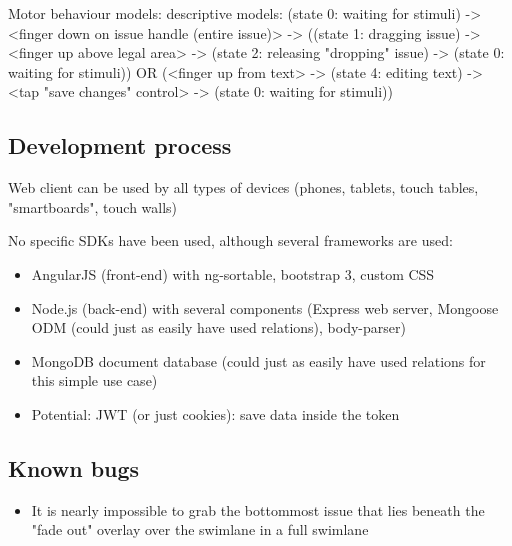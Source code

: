 Motor behaviour models: descriptive models: (state 0: waiting for stimuli) -> <finger down on issue handle (entire issue)> -> ((state 1: dragging issue) -> <finger up above legal area> -> (state 2: releasing "dropping" issue) -> (state 0: waiting for stimuli)) OR (<finger up from text> -> (state 4: editing text) -> <tap "save changes" control> -> (state 0: waiting for stimuli))

\subsection{Development process}

Web client can be used by all types of devices (phones, tablets, touch tables, "smartboards", touch walls)

No specific SDKs have been used, although several frameworks are used:
\begin{itemize}
  \item AngularJS (front-end) with ng-sortable, bootstrap 3, custom CSS
  \item Node.js (back-end) with several components (Express web server, Mongoose ODM (could just as easily have used relations), body-parser)
  \item MongoDB document database (could just as easily have used relations for this simple use case)
  \item Potential: JWT (or just cookies): save data inside the token
\end{itemize}

\subsection{Known bugs}

\begin{itemize}
  \item It is nearly impossible to grab the bottommost issue that lies beneath the "fade out" overlay over the swimlane in a full swimlane
\end{itemize}
